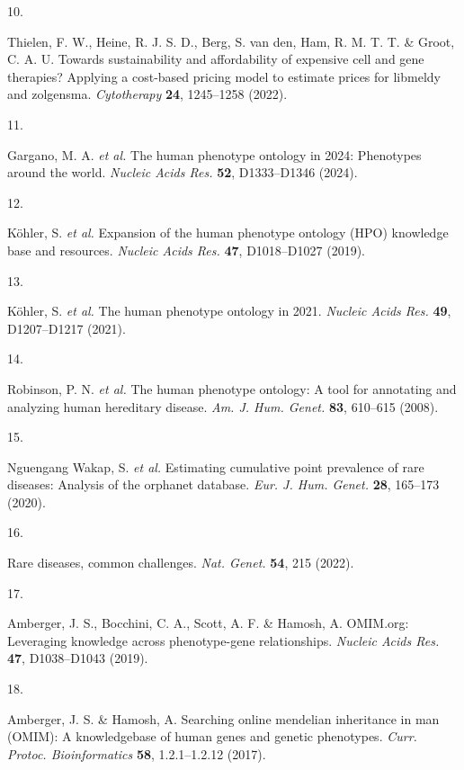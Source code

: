 \documentclass[
]{report}
\newlength{\cslhangindent}
\newlength{\csllabelwidth}
\newenvironment{CSLReferences}[2] %
 {\begin{list}{}{%
  \setlength{\itemindent}{0pt}
  \setlength{\leftmargin}{0pt}
  \setlength{\parsep}{0pt}
  \ifodd #1
   \setlength{\leftmargin}{\cslhangindent}
   \setlength{\itemindent}{-1\cslhangindent}
  \fi
  \setlength{\itemsep}{#2\baselineskip}}}
 {\end{list}}
\newcommand{\CSLLeftMargin}[1]{\parbox[t]{\csllabelwidth}{\strut#1\strut}}
\newcommand{\CSLRightInline}[1]{\parbox[t]{\linewidth - \csllabelwidth}{\strut#1\strut}}
\begin{document}
\begin{CSLReferences}{0}{0}
\CSLLeftMargin{10. }%
\CSLRightInline{Thielen, F. W., Heine, R. J. S. D., Berg, S. van den,
Ham, R. M. T. T. \& Groot, C. A. U. Towards sustainability and
affordability of expensive cell and gene therapies? Applying a
cost-based pricing model to estimate prices for libmeldy and zolgensma.
\emph{Cytotherapy} \textbf{24}, 1245--1258 (2022).}

\CSLLeftMargin{11. }%
\CSLRightInline{Gargano, M. A. \emph{et al.} The human phenotype
ontology in 2024: Phenotypes around the world. \emph{Nucleic Acids Res.}
\textbf{52}, D1333--D1346 (2024).}

\CSLLeftMargin{12. }%
\CSLRightInline{Köhler, S. \emph{et al.} Expansion of the human
phenotype ontology ({HPO}) knowledge base and resources. \emph{Nucleic
Acids Res.} \textbf{47}, D1018--D1027 (2019).}

\CSLLeftMargin{13. }%
\CSLRightInline{Köhler, S. \emph{et al.} The human phenotype ontology in
2021. \emph{Nucleic Acids Res.} \textbf{49}, D1207--D1217 (2021).}

\CSLLeftMargin{14. }%
\CSLRightInline{Robinson, P. N. \emph{et al.} The human phenotype
ontology: A tool for annotating and analyzing human hereditary disease.
\emph{Am. J. Hum. Genet.} \textbf{83}, 610--615 (2008).}

\CSLLeftMargin{15. }%
\CSLRightInline{Nguengang Wakap, S. \emph{et al.} Estimating cumulative
point prevalence of rare diseases: Analysis of the orphanet database.
\emph{Eur. J. Hum. Genet.} \textbf{28}, 165--173 (2020).}

\CSLLeftMargin{16. }%
\CSLRightInline{Rare diseases, common challenges. \emph{Nat. Genet.}
\textbf{54}, 215 (2022).}

\CSLLeftMargin{17. }%
\CSLRightInline{Amberger, J. S., Bocchini, C. A., Scott, A. F. \&
Hamosh, A. {OMIM.org}: Leveraging knowledge across phenotype-gene
relationships. \emph{Nucleic Acids Res.} \textbf{47}, D1038--D1043
(2019).}

\CSLLeftMargin{18. }%
\CSLRightInline{Amberger, J. S. \& Hamosh, A. Searching online mendelian
inheritance in man ({OMIM)}: A knowledgebase of human genes and genetic
phenotypes. \emph{Curr. Protoc. Bioinformatics} \textbf{58},
1.2.1--1.2.12 (2017).}


\end{CSLReferences}
\end{document}

